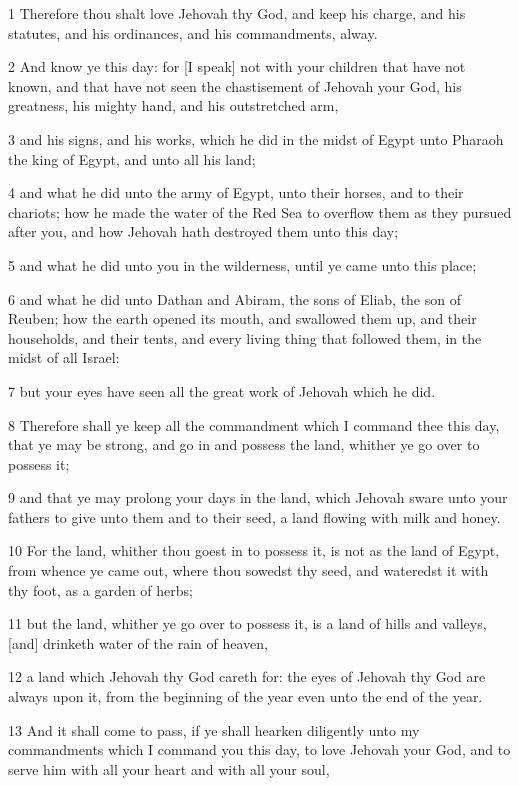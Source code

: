 \par 1 Therefore thou shalt love Jehovah thy God, and keep his charge, and his statutes, and his ordinances, and his commandments, alway.
\par 2 And know ye this day: for [I speak] not with your children that have not known, and that have not seen the chastisement of Jehovah your God, his greatness, his mighty hand, and his outstretched arm,
\par 3 and his signs, and his works, which he did in the midst of Egypt unto Pharaoh the king of Egypt, and unto all his land;
\par 4 and what he did unto the army of Egypt, unto their horses, and to their chariots; how he made the water of the Red Sea to overflow them as they pursued after you, and how Jehovah hath destroyed them unto this day;
\par 5 and what he did unto you in the wilderness, until ye came unto this place;
\par 6 and what he did unto Dathan and Abiram, the sons of Eliab, the son of Reuben; how the earth opened its mouth, and swallowed them up, and their households, and their tents, and every living thing that followed them, in the midst of all Israel:
\par 7 but your eyes have seen all the great work of Jehovah which he did.
\par 8 Therefore shall ye keep all the commandment which I command thee this day, that ye may be strong, and go in and possess the land, whither ye go over to possess it;
\par 9 and that ye may prolong your days in the land, which Jehovah sware unto your fathers to give unto them and to their seed, a land flowing with milk and honey.
\par 10 For the land, whither thou goest in to possess it, is not as the land of Egypt, from whence ye came out, where thou sowedst thy seed, and wateredst it with thy foot, as a garden of herbs;
\par 11 but the land, whither ye go over to possess it, is a land of hills and valleys, [and] drinketh water of the rain of heaven,
\par 12 a land which Jehovah thy God careth for: the eyes of Jehovah thy God are always upon it, from the beginning of the year even unto the end of the year.
\par 13 And it shall come to pass, if ye shall hearken diligently unto my commandments which I command you this day, to love Jehovah your God, and to serve him with all your heart and with all your soul,
